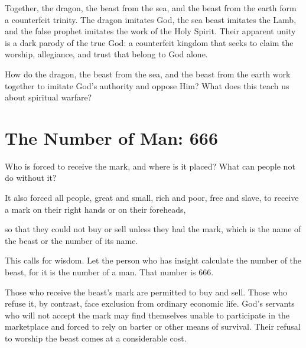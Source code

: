 Together, the dragon, the beast from the sea, and the beast from the earth form a counterfeit trinity. The dragon imitates God, the sea beast imitates the Lamb, and the false prophet imitates the work of the Holy Spirit. Their apparent unity is a dark parody of the true God: a counterfeit kingdom that seeks to claim the worship, allegiance, and trust that belong to God alone.

\begin{ReaderQuestion}
How do the dragon, the beast from the sea, and the beast from the earth work together to imitate God's authority and oppose Him? What does this teach us about spiritual warfare?
\end{ReaderQuestion}

\section{The Number of Man: 666}

\begin{ScriptureBox2}{Who is forced to receive the mark, and where is it placed? What can people not do without it?}

\item[13:16] It also forced all people, great and small, rich and poor, free and slave, to receive a mark on their right hands or on their foreheads,

\item[13:17] so that they could not buy or sell unless they had the mark, which is the name of the beast or the number of its name.

\item[13:18] This calls for wisdom. Let the person who has insight calculate the number of the beast, for it is the number of a man. That number is 666.

\end{ScriptureBox2}

Those who receive the beast's mark are permitted to buy and sell. Those who refuse it, by contrast, face exclusion from ordinary economic life. God's servants who will not accept the mark may find themselves unable to participate in the marketplace and forced to rely on barter or other means of survival. Their refusal to worship the beast comes at a considerable cost.

